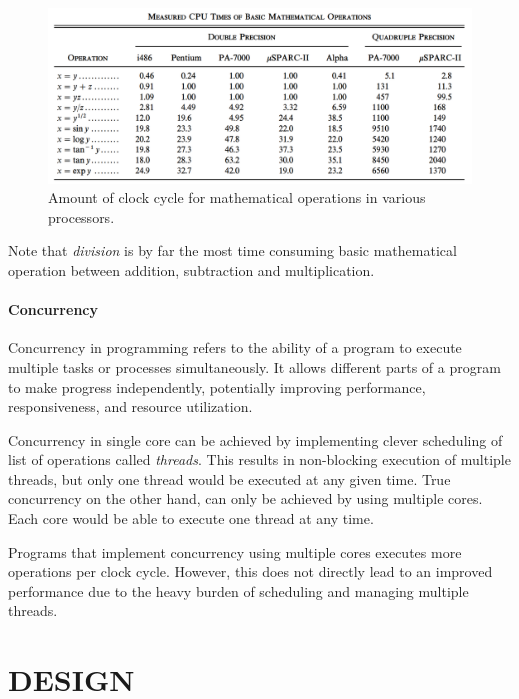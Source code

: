 \documentclass[a4paper,oneside,12pt]{report}
\numberwithin{equation}{chapter}
\begin{document}
\begin{figure}[h!]
    \centering
    \includegraphics[width=.9\textwidth]{./figures/cpu_instruction_speed.png}
    \caption{Amount of clock cycle for mathematical operations in various processors. \cite{cpu_instruction_speed}}
\end{figure}

Note that \textit{division} is by far the most time consuming basic mathematical operation between addition, subtraction and multiplication.

\subsubsection{Concurrency}

Concurrency in programming refers to the ability of a program to execute multiple tasks or processes simultaneously. It allows different parts of a program to make progress independently, potentially improving performance, responsiveness, and resource utilization.

Concurrency in single core can be achieved by implementing clever scheduling of list of operations called \textit{threads}. This results in non-blocking execution of multiple threads, but only one thread would be executed at any given time. 
True concurrency on the other hand, can only be achieved by using multiple cores. Each core would be able to execute one thread at any time.

Programs that implement concurrency using multiple cores executes more operations per clock cycle. However, this does not directly lead to an improved performance due to the heavy burden of scheduling and managing multiple threads.




\newpage


\chapter{DESIGN}
\end{document}
